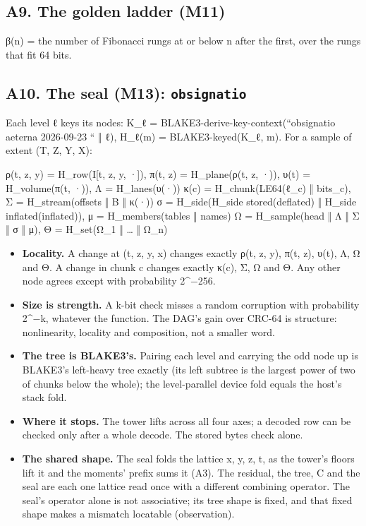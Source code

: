 \subsection{\texorpdfstring{A9. The golden ladder (M11)}{A9. The golden ladder (M11)}}

β(n) = the number of Fibonacci rungs at or below n after the first, over the rungs that fit 64 bits.

\subsection{\texorpdfstring{A10. The seal (M13): \texttt{obsignatio}}{A10. The seal (M13): obsignatio}}

Each level ℓ keys its nodes: K\_\allowbreak{}ℓ = BLAKE3-derive-key-context(“obsignatio aeterna 2026-09-23 “ ‖ ℓ), H\_\allowbreak{}ℓ(m) = BLAKE3-keyed(K\_\allowbreak{}ℓ, m). For a sample of extent (T, Z, Y, X):

ρ(t, z, y) = H\_\allowbreak{}row(I[t, z, y, ·]),  π(t, z) = H\_\allowbreak{}plane(ρ(t, z, ·)),  υ(t) = H\_\allowbreak{}volume(π(t, ·)),  Λ = H\_\allowbreak{}lanes(υ(·)) κ(c) = H\_\allowbreak{}chunk(LE64(ℓ\_\allowbreak{}c) ‖ bits\_\allowbreak{}c),  Σ = H\_\allowbreak{}stream(offsets ‖ B ‖ κ(·)) σ = H\_\allowbreak{}side(H\_\allowbreak{}side stored(deflated) ‖ H\_\allowbreak{}side inflated(inflated)),  μ = H\_\allowbreak{}members(tables ‖ names) Ω = H\_\allowbreak{}sample(head ‖ Λ ‖ Σ ‖ σ ‖ μ),  Θ = H\_\allowbreak{}set(Ω\_\allowbreak{}1 ‖ … ‖ Ω\_\allowbreak{}n)

\begin{itemize}
\item \textbf{Locality.} A change at (t, z, y, x) changes exactly ρ(t, z, y), π(t, z), υ(t), Λ, Ω and Θ. A change in chunk c changes exactly κ(c), Σ, Ω and Θ. Any other node agrees except with probability 2\textasciicircum{}−256.
\item \textbf{Size is strength.} A k-bit check misses a random corruption with probability 2\textasciicircum{}−k, whatever the function. The DAG's gain over CRC-64 is structure: nonlinearity, locality and composition, not a smaller word.
\item \textbf{The tree is BLAKE3's.} Pairing each level and carrying the odd node up is BLAKE3's left-heavy tree exactly (its left subtree is the largest power of two of chunks below the whole); the level-parallel device fold equals the host's stack fold.
\item \textbf{Where it stops.} The tower lifts across all four axes; a decoded row can be checked only after a whole decode. The stored bytes check alone.
\item \textbf{The shared shape.} The seal folds the lattice x, y, z, t, as the tower's floors lift it and the moments' prefix sums it (A3). The residual, the tree, C and the seal are each one lattice read once with a different combining operator. The seal's operator alone is not associative; its tree shape is fixed, and that fixed shape makes a mismatch locatable (observation).
\end{itemize}

